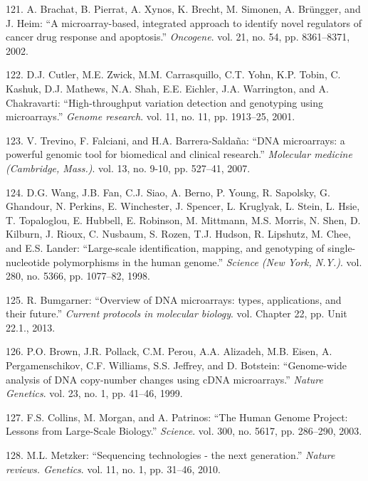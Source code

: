 \documentclass[12pt,a4paper,twoside]{ugathesis}
\theoremstyle{definition}
\theoremstyle{definition}
\theoremstyle{definition}
\theoremstyle{remark}
\begin{document}
\hypertarget{ref-Brachat2002}{}
121. A. Brachat, B. Pierrat, A. Xynos, K. Brecht, M. Simonen, A.
Brüngger, and J. Heim: ``A microarray-based, integrated approach to
identify novel regulators of cancer drug response and apoptosis.''
\emph{Oncogene}. vol. 21, no. 54, pp. 8361--8371, 2002.

\hypertarget{ref-Cutler2001}{}
122. D.J. Cutler, M.E. Zwick, M.M. Carrasquillo, C.T. Yohn, K.P. Tobin,
C. Kashuk, D.J. Mathews, N.A. Shah, E.E. Eichler, J.A. Warrington, and
A. Chakravarti: ``High-throughput variation detection and genotyping
using microarrays.'' \emph{Genome research}. vol. 11, no. 11, pp.
1913--25, 2001.

\hypertarget{ref-Trevino2007}{}
123. V. Trevino, F. Falciani, and H.A. Barrera-Saldaña: ``DNA
microarrays: a powerful genomic tool for biomedical and clinical
research.'' \emph{Molecular medicine (Cambridge, Mass.)}. vol. 13, no.
9-10, pp. 527--41, 2007.

\hypertarget{ref-Wang1998}{}
124. D.G. Wang, J.B. Fan, C.J. Siao, A. Berno, P. Young, R. Sapolsky, G.
Ghandour, N. Perkins, E. Winchester, J. Spencer, L. Kruglyak, L. Stein,
L. Hsie, T. Topaloglou, E. Hubbell, E. Robinson, M. Mittmann, M.S.
Morris, N. Shen, D. Kilburn, J. Rioux, C. Nusbaum, S. Rozen, T.J.
Hudson, R. Lipshutz, M. Chee, and E.S. Lander: ``Large-scale
identification, mapping, and genotyping of single-nucleotide
polymorphisms in the human genome.'' \emph{Science (New York, N.Y.)}.
vol. 280, no. 5366, pp. 1077--82, 1998.

\hypertarget{ref-Bumgarner2013}{}
125. R. Bumgarner: ``Overview of DNA microarrays: types, applications,
and their future.'' \emph{Current protocols in molecular biology}. vol.
Chapter 22, pp. Unit 22.1., 2013.

\hypertarget{ref-Brown1999}{}
126. P.O. Brown, J.R. Pollack, C.M. Perou, A.A. Alizadeh, M.B. Eisen, A.
Pergamenschikov, C.F. Williams, S.S. Jeffrey, and D. Botstein:
``Genome-wide analysis of DNA copy-number changes using cDNA
microarrays.'' \emph{Nature Genetics}. vol. 23, no. 1, pp. 41--46, 1999.

\hypertarget{ref-Collins2003}{}
127. F.S. Collins, M. Morgan, and A. Patrinos: ``The Human Genome
Project: Lessons from Large-Scale Biology.'' \emph{Science}. vol. 300,
no. 5617, pp. 286--290, 2003.

\hypertarget{ref-Metzker2010}{}
128. M.L. Metzker: ``Sequencing technologies - the next generation.''
\emph{Nature reviews. Genetics}. vol. 11, no. 1, pp. 31--46, 2010.
\end{document}
